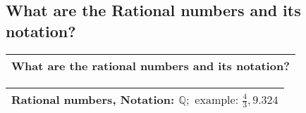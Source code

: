 \subsection{What are the Rational numbers and its notation?}
\begin{small}
    \begin{tabularx}{1\textwidth}{
            p{}
        }
        \toprule
        What are the rational numbers and its notation?
        \\
        \bottomrule

    \end{tabularx}
\end{small}
\begin{small}
    \begin{tabularx}{1\textwidth}{
            p{}
        }
        \toprule
        Rational numbers, Notation: $ \mathbb{Q}; \text{ example: } \frac{4}{3}, 9.324$\\
        \bottomrule

    \end{tabularx}
\end{small}

